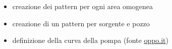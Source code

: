 \documentclass{beamer}
\begin{document}
\begin{frame}
\begin{columns}
\begin{column}{.5\textwidth}
\begin{figure}
\begin{overprint}
	   \begin{center}
	    \\
	   \end{center}
	  \end{overprint}
	  \end{figure}
	 \end{column}
%
	\begin{column}{.5\textwidth}
		\begin{itemize}[<+->]
		 \onslide<1>\item creazione dei pattern per ogni area omogenea
		 \onslide<2>\item creazione di un pattern per sorgente e pozzo
		 \onslide<3>\item definizione della curva della pompa (fonte \href{https://www.oppo.it/materiali/pompe/elettr_pompa-sommerse-4.html}{oppo.it})
		\end{itemize}
	\end{column}
	\end{columns}
\end{frame}
\end{document}
